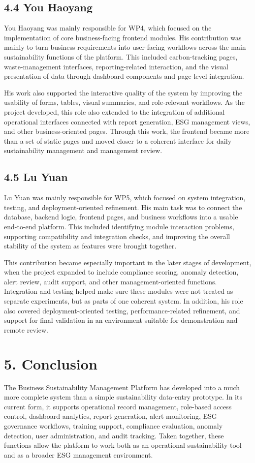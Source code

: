 \documentclass[10pt,a4paper]{article}
\begin{document}
\subsection*{4.4 You Haoyang}
You Haoyang was mainly responsible for WP4, which focused on the implementation of core business-facing frontend modules. His contribution was mainly to turn business requirements into user-facing workflows across the main sustainability functions of the platform. This included carbon-tracking pages, waste-management interfaces, reporting-related interaction, and the visual presentation of data through dashboard components and page-level integration.

His work also supported the interactive quality of the system by improving the usability of forms, tables, visual summaries, and role-relevant workflows. As the project developed, this role also extended to the integration of additional operational interfaces connected with report generation, ESG management views, and other business-oriented pages. Through this work, the frontend became more than a set of static pages and moved closer to a coherent interface for daily sustainability management and management review.

\subsection*{4.5 Lu Yuan}
Lu Yuan was mainly responsible for WP5, which focused on system integration, testing, and deployment-oriented refinement. His main task was to connect the database, backend logic, frontend pages, and business workflows into a usable end-to-end platform. This included identifying module interaction problems, supporting compatibility and integration checks, and improving the overall stability of the system as features were brought together.

This contribution became especially important in the later stages of development, when the project expanded to include compliance scoring, anomaly detection, alert review, audit support, and other management-oriented functions. Integration and testing helped make sure these modules were not treated as separate experiments, but as parts of one coherent system. In addition, his role also covered deployment-oriented testing, performance-related refinement, and support for final validation in an environment suitable for demonstration and remote review.

\section*{5. Conclusion}
The Business Sustainability Management Platform has developed into a much more complete system than a simple sustainability data-entry prototype. In its current form, it supports operational record management, role-based access control, dashboard analytics, report generation, alert monitoring, ESG governance workflows, training support, compliance evaluation, anomaly detection, user administration, and audit tracking. Taken together, these functions allow the platform to work both as an operational sustainability tool and as a broader ESG management environment.
\end{document}
